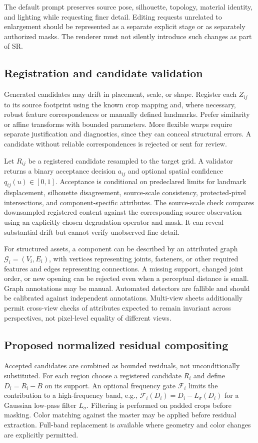 \documentclass[10pt,twocolumn]{article}
\begin{document}
The default prompt preserves source pose, silhouette, topology, material identity, and lighting while requesting finer detail. Editing requests unrelated to enlargement should be represented as a separate explicit stage or as separately authorized masks. The renderer must not silently introduce such changes as part of SR.
\subsection{Registration and candidate validation}
Generated candidates may drift in placement, scale, or shape. Register each $Z_{ij}$ to its source footprint using the known crop mapping and, where necessary, robust feature correspondences or manually defined landmarks. Prefer similarity or affine transforms with bounded parameters. More flexible warps require separate justification and diagnostics, since they can conceal structural errors. A candidate without reliable correspondences is rejected or sent for review.

Let $R_{ij}$ be a registered candidate resampled to the target grid. A validator returns a binary acceptance decision $a_{ij}$ and optional spatial confidence $q_{ij}(u)\in[0,1]$. Acceptance is conditional on predeclared limits for landmark displacement, silhouette disagreement, source-scale consistency, protected-pixel intersections, and component-specific attributes. The source-scale check compares downsampled registered content against the corresponding source observation using an explicitly chosen degradation operator and mask. It can reveal substantial drift but cannot verify unobserved fine detail.

For structured assets, a component can be described by an attributed graph $\mathcal G_i=(V_i,E_i)$, with vertices representing joints, fasteners, or other required features and edges representing connections. A missing support, changed joint order, or new opening can be rejected even when a perceptual distance is small. Graph annotations may be manual. Automated detectors are fallible and should be calibrated against independent annotations. Multi-view sheets additionally permit cross-view checks of attributes expected to remain invariant across perspectives, not pixel-level equality of different views.
\subsection{Proposed normalized residual compositing}
Accepted candidates are combined as bounded residuals, not unconditionally substituted. For each region choose a registered candidate $R_i$ and define $D_i=R_i-B$ on its support. An optional frequency gate $\mathcal F_i$ limits the contribution to a high-frequency band, e.g., $\mathcal F_i(D_i)=D_i-L_\sigma(D_i)$ for a Gaussian low-pass filter $L_\sigma$. Filtering is performed on padded crops before masking. Color matching against the master may be applied before residual extraction. Full-band replacement is available where geometry and color changes are explicitly permitted.
\end{document}
